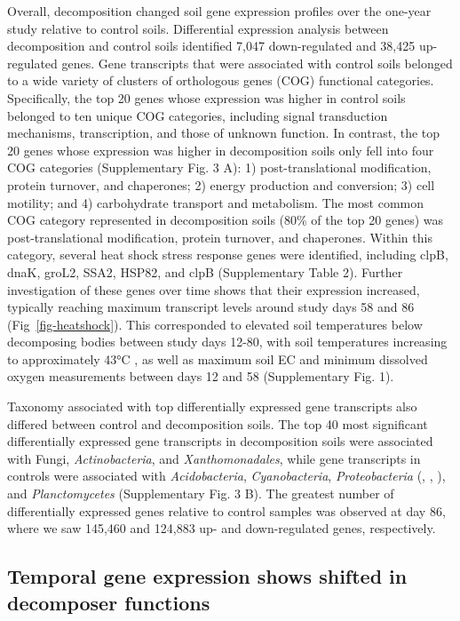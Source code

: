 \documentclass[
  sn-nature,
  lineno, referee]{sn-jnl}
\begin{document}
Overall, decomposition changed soil gene expression profiles over the
one-year study relative to control soils. Differential expression
analysis between decomposition and control soils identified 7,047
down-regulated and 38,425 up-regulated genes. Gene transcripts that were
associated with control soils belonged to a wide variety of clusters of
orthologous genes (COG) functional categories. Specifically, the top 20
genes whose expression was higher in control soils belonged to ten
unique COG categories, including signal transduction mechanisms,
transcription, and those of unknown function. In contrast, the top 20
genes whose expression was higher in decomposition soils only fell into
four COG categories (Supplementary Fig. 3 A): 1) post-translational
modification, protein turnover, and chaperones; 2) energy production and
conversion; 3) cell motility; and 4) carbohydrate transport and
metabolism. The most common COG category represented in decomposition
soils (80\% of the top 20 genes) was post-translational modification,
protein turnover, and chaperones. Within this category, several heat
shock stress response genes were identified, including clpB, dnaK,
groL2, SSA2, HSP82, and clpB (Supplementary Table 2). Further
investigation of these genes over time shows that their expression
increased, typically reaching maximum transcript levels around study
days 58 and 86 (Fig~\ref{fig-heatshock}). This corresponded to elevated
soil temperatures below decomposing bodies between study days 12-80,
with soil temperatures increasing to approximately 43°C
\citep{taylor_transient_2024}, as well as maximum soil EC and minimum
dissolved oxygen measurements between days 12 and 58 (Supplementary Fig.
1).

Taxonomy associated with top differentially expressed gene transcripts
also differed between control and decomposition soils. The top 40 most
significant differentially expressed gene transcripts in decomposition
soils were associated with Fungi, \emph{Actinobacteria}, and
\emph{Xanthomonadales}, while gene transcripts in controls were
associated with \emph{Acidobacteria}, \emph{Cyanobacteria},
\emph{Proteobacteria} (\textalpha, \textdelta, \textgamma), and
\emph{Planctomycetes} (Supplementary Fig. 3 B). The greatest number of
differentially expressed genes relative to control samples was observed
at day 86, where we saw 145,460 and 124,883 up- and down-regulated
genes, respectively.

\subsection{Temporal gene expression shows shifted in decomposer
functions}\label{temporal-gene-expression-shows-shifted-in-decomposer-functions}
\end{document}
